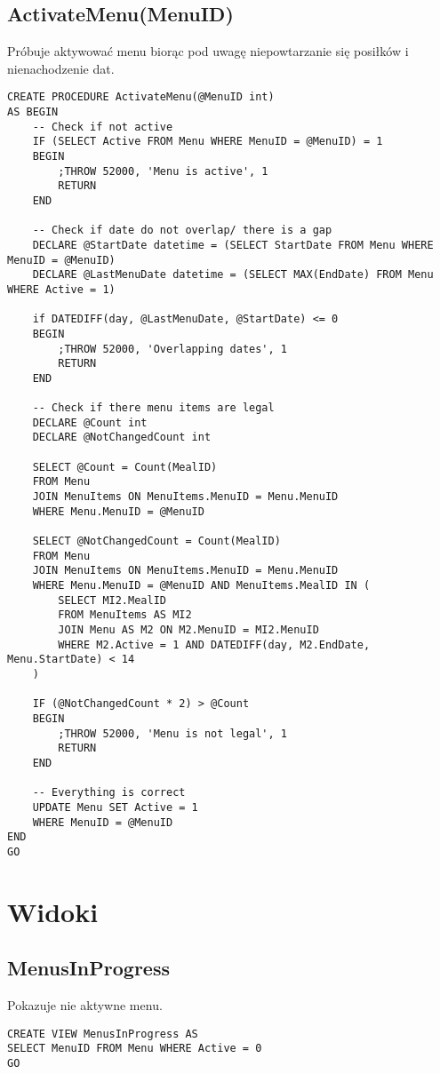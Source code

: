 \subsection{ActivateMenu(MenuID)}
Próbuje aktywować menu biorąc pod uwagę niepowtarzanie się posiłków i nienachodzenie dat.
\begin{verbatim}
CREATE PROCEDURE ActivateMenu(@MenuID int)
AS BEGIN
    -- Check if not active
    IF (SELECT Active FROM Menu WHERE MenuID = @MenuID) = 1
    BEGIN
        ;THROW 52000, 'Menu is active', 1
        RETURN
    END

    -- Check if date do not overlap/ there is a gap
    DECLARE @StartDate datetime = (SELECT StartDate FROM Menu WHERE MenuID = @MenuID)
    DECLARE @LastMenuDate datetime = (SELECT MAX(EndDate) FROM Menu WHERE Active = 1)
    
    if DATEDIFF(day, @LastMenuDate, @StartDate) <= 0
    BEGIN
        ;THROW 52000, 'Overlapping dates', 1
        RETURN
    END

    -- Check if there menu items are legal
    DECLARE @Count int
    DECLARE @NotChangedCount int

    SELECT @Count = Count(MealID)
    FROM Menu
    JOIN MenuItems ON MenuItems.MenuID = Menu.MenuID
    WHERE Menu.MenuID = @MenuID

    SELECT @NotChangedCount = Count(MealID)
    FROM Menu 
    JOIN MenuItems ON MenuItems.MenuID = Menu.MenuID
    WHERE Menu.MenuID = @MenuID AND MenuItems.MealID IN (
        SELECT MI2.MealID
        FROM MenuItems AS MI2
        JOIN Menu AS M2 ON M2.MenuID = MI2.MenuID
        WHERE M2.Active = 1 AND DATEDIFF(day, M2.EndDate, Menu.StartDate) < 14
    )

    IF (@NotChangedCount * 2) > @Count
    BEGIN
        ;THROW 52000, 'Menu is not legal', 1
        RETURN
    END

    -- Everything is correct
    UPDATE Menu SET Active = 1
    WHERE MenuID = @MenuID
END
GO
\end{verbatim}
\section{Widoki}
\subsection{MenusInProgress}
Pokazuje nie aktywne menu.
\begin{verbatim}
CREATE VIEW MenusInProgress AS
SELECT MenuID FROM Menu WHERE Active = 0
GO
\end{verbatim}

